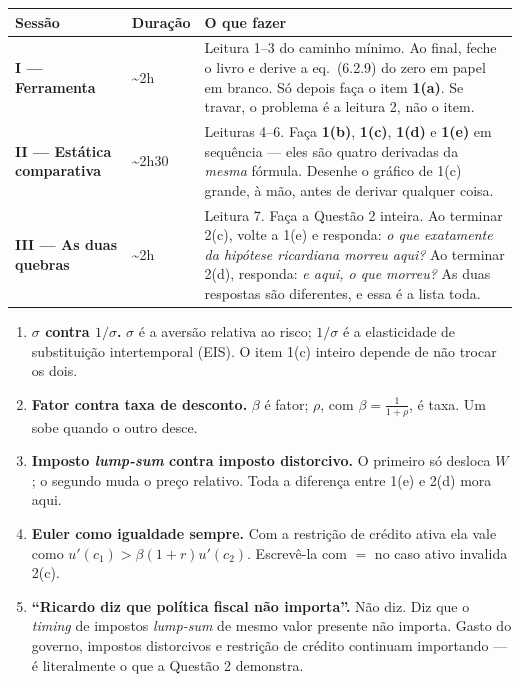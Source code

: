 \documentclass[11pt, a4paper]{article}
\begin{document}
\begin{center}
\small
\begin{tabular}{@{}llp{9.4cm}@{}}
\toprule
\textbf{Sessão} & \textbf{Duração} & \textbf{O que fazer} \\
\midrule
\textbf{I --- Ferramenta}
& \textasciitilde 2h
& Leitura 1--3 do caminho mínimo. Ao final, feche o livro e derive a eq.\ (6.2.9)
  do zero em papel em branco. Só depois faça o item \textbf{1(a)}. Se travar, o
  problema é a leitura 2, não o item. \\
\textbf{II --- Estática comparativa}
& \textasciitilde 2h30
& Leituras 4--6. Faça \textbf{1(b)}, \textbf{1(c)}, \textbf{1(d)} e \textbf{1(e)} em
  sequência --- eles são quatro derivadas da \emph{mesma} fórmula. Desenhe o gráfico
  de 1(c) grande, à mão, antes de derivar qualquer coisa. \\
\textbf{III --- As duas quebras}
& \textasciitilde 2h
& Leitura 7. Faça a Questão 2 inteira. Ao terminar 2(c), volte a 1(e) e responda:
  \emph{o que exatamente da hipótese ricardiana morreu aqui?} Ao terminar 2(d),
  responda: \emph{e aqui, o que morreu?} As duas respostas são diferentes, e essa é a
  lista toda. \\
\bottomrule
\end{tabular}
\end{center}

\begin{tcolorbox}[trapbox, title={As cinco confusões que mais custam nota nesta lista}]
\small
\begin{enumerate}[label=\arabic*.]
\item \textbf{$\sigma$ contra $1/\sigma$.} $\sigma$ é a aversão relativa ao risco;
$1/\sigma$ é a elasticidade de substituição intertemporal (EIS). O item 1(c) inteiro
depende de não trocar os dois.
\item \textbf{Fator contra taxa de desconto.} $\beta$ é fator; $\rho$, com
$\beta=\frac{1}{1+\rho}$, é taxa. Um sobe quando o outro desce.
\item \textbf{Imposto \emph{lump-sum} contra imposto distorcivo.} O primeiro só desloca
$W$; o segundo muda o preço relativo. Toda a diferença entre 1(e) e 2(d) mora aqui.
\item \textbf{Euler como igualdade sempre.} Com a restrição de crédito ativa ela vale
como $u'(c_1)>\beta(1+r)u'(c_2)$. Escrevê-la com $=$ no caso ativo invalida 2(c).
\item \textbf{``Ricardo diz que política fiscal não importa''.} Não diz. Diz que o
\emph{timing} de impostos \emph{lump-sum} de mesmo valor presente não importa. Gasto do
governo, impostos distorcivos e restrição de crédito continuam importando --- é
literalmente o que a Questão 2 demonstra.
\end{enumerate}
\end{tcolorbox}
\end{document}
